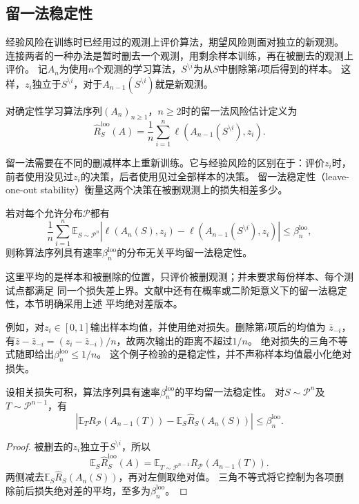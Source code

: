 \subsection{留一法稳定性}

经验风险在训练时已经用过的观测上评价算法，期望风险则面对独立的新观测。
连接两者的一种办法是暂时删去一个观测，用剩余样本训练，再在被删去的观测上评价。
记$A_n$为使用$n$个观测的学习算法，$S^{\setminus i}$为从$S$中删除第$i$项后得到的样本。
这样，$z_i$独立于$S^{\setminus i}$，对于$A_{n-1}(S^{\setminus i})$就是新观测。

\begin{definition}[留一法风险估计]
\label{def:loo-risk}
对确定性学习算法序列$(A_n)_{n\geq1}$，$n\geq2$时的留一法风险估计定义为
\[
 \hat R_S^{\mathrm{loo}}(A)
 =\frac1n\sum_{i=1}^n\ell(A_{n-1}(S^{\setminus i}),z_i).
\]
\end{definition}

留一法需要在不同的删减样本上重新训练。它与经验风险的区别在于：评价$z_i$时，
前者使用没见过$z_i$的决策，后者使用见过全部样本的决策。
留一法稳定性（leave-one-out stability）衡量这两个决策在被删观测上的损失相差多少。

\begin{definition}[平均留一法稳定性]
\label{def:loo-stability}
若对每个允许分布$\mathcal P$都有
\[
 \frac1n\sum_{i=1}^n\mathbb E_{S\sim\mathcal P^n}
 \left|\ell(A_n(S),z_i)-\ell(A_{n-1}(S^{\setminus i}),z_i)\right|
 \leq\beta_n^{\mathrm{loo}},
\]
则称算法序列具有速率$\beta_n^{\mathrm{loo}}$的分布无关平均留一法稳定性。
\end{definition}

这里平均的是样本和被删除的位置，只评价被删观测；并未要求每份样本、每个测试点都满足
同一个损失差上界。文献中还有在概率或二阶矩意义下的留一法稳定性，本节明确采用上述
平均绝对差版本。

例如，对$z_i\in[0,1]$输出样本均值，并使用绝对损失。删除第$i$项后的均值为
$\bar z_{-i}$，有$\bar z-\bar z_{-i}=(z_i-\bar z_{-i})/n$，故两次输出的距离不超过$1/n$。
绝对损失的三角不等式随即给出$\beta_n^{\mathrm{loo}}\leq1/n$。
这个例子检验的是稳定性，并不声称样本均值最小化绝对损失。

\begin{theorem}[留一法稳定性与期望风险]
\label{thm:loo-risk}
设相关损失可积，算法序列具有速率$\beta_n^{\mathrm{loo}}$的平均留一法稳定性。
对$S\sim\mathcal P^n$及$T\sim\mathcal P^{n-1}$，有
\[
 \left|\mathbb E_T R_{\mathcal P}(A_{n-1}(T))
       -\mathbb E_S\hat R_S(A_n(S))\right|\leq\beta_n^{\mathrm{loo}}.
\]
\end{theorem}
\begin{proof}
被删去的$z_i$独立于$S^{\setminus i}$，所以
\[
 \mathbb E_S\hat R_S^{\mathrm{loo}}(A)
 =\mathbb E_{T\sim\mathcal P^{n-1}}R_{\mathcal P}(A_{n-1}(T)).
\]
两侧减去$\mathbb E_S\hat R_S(A_n(S))$，再对左侧取绝对值。
三角不等式将它控制为各项删除前后损失绝对差的平均，至多为$\beta_n^{\mathrm{loo}}$。
\end{proof}

